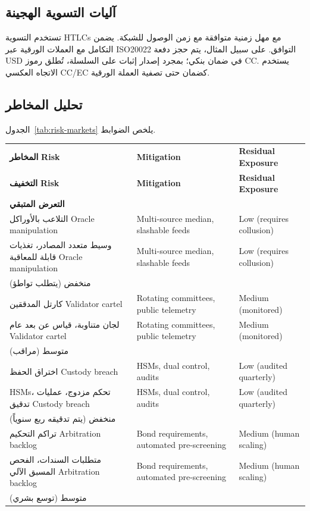 \documentclass[11pt]{article}
\begin{document}
\subsection{آليات التسوية الهجينة}
تستخدم التسوية HTLCs مع مهل زمنية متوافقة مع زمن الوصول للشبكة. يضمن التكامل مع العملات الورقية عبر ISO20022 التوافق. على سبيل المثال، يتم حجز دفعة USD في ضمان بنكي؛ بمجرد إصدار إثبات على السلسلة، تُطلق رموز CC. يستخدم الاتجاه العكسي CC/EC كضمان حتى تصفية العملة الورقية.

\subsection{تحليل المخاطر}
الجدول~\ref{tab:risk-markets} يلخص الضوابط.

\begin{table}[H]
  \centering
  \begin{tabular}{p{}p{}p{}}
    \toprule
    \textbf{المخاطر}     \textbf{Risk} & \textbf{Mitigation} & \textbf{Residual Exposure} \\ \textbf{التخفيف}     \textbf{Risk} & \textbf{Mitigation} & \textbf{Residual Exposure} \\ \textbf{التعرض المتبقي} \\
    \midrule
    التلاعب بالأوراكل     Oracle manipulation & Multi-source median, slashable feeds & Low (requires collusion) \\ وسيط متعدد المصادر، تغذيات قابلة للمعاقبة     Oracle manipulation & Multi-source median, slashable feeds & Low (requires collusion) \\ منخفض (يتطلب تواطؤ) \\
    كارتل المدققين     Validator cartel & Rotating committees, public telemetry & Medium (monitored) \\ لجان متناوبة، قياس عن بعد عام     Validator cartel & Rotating committees, public telemetry & Medium (monitored) \\ متوسط (مراقب) \\
    اختراق الحفظ     Custody breach & HSMs, dual control, audits & Low (audited quarterly) \\ HSMs، تحكم مزدوج، عمليات تدقيق     Custody breach & HSMs, dual control, audits & Low (audited quarterly) \\ منخفض (يتم تدقيقه ربع سنوياً) \\
    تراكم التحكيم     Arbitration backlog & Bond requirements, automated pre-screening & Medium (human scaling) \\ متطلبات السندات، الفحص المسبق الآلي     Arbitration backlog & Bond requirements, automated pre-screening & Medium (human scaling) \\ متوسط (توسع بشري) \\

\end{tabular}
\end{table}
\end{document}
